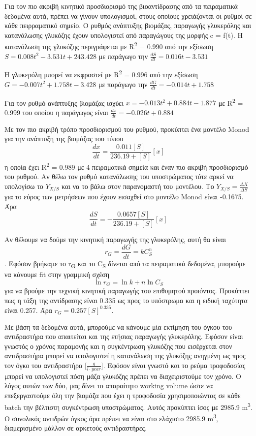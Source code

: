 \documentclass[11pt]{article}
\begin{document}
Για τον πιο ακριβή κινητικό προσδιορισμό της βιοαντίδρασης από τα πειραματικά δεδομένα αυτά, πρέπει να γίνουν υπολογισμοί, στους οποίους χρειάζονται οι ρυθμοί σε κάθε πειρραματικό σημείο. Ο ρυθμός ανάπτυξης βιομάζας, παραγωγής γλυκερόλης και κατανάλωσης γλυκόζης έχουν υπολογιστεί από παραγώγους της μορφής c = f(t). Η κατανάλωση της γλυκόζης περιγράφεται με R\textsuperscript{2} = 0.990 από την εξίσωση \(S = 0.008t^2 - 3.531t + 243.428\) με παράγωγο την \(\frac{dS}{dt} = 0.016t - 3.531\)

Η γλυκερόλη μπορεί να εκφραστεί με R\textsuperscript{2} = 0.996 από την εξίσωση \(G = -0.007t^2 + 1.758t - 3.428\) με παράγωγο την \(\frac{dG}{dt} = -0.014t + 1.758\)

Για τον ρυθμό ανάπτυξης βιομάζας ισχύει \(x = -0.013t^2 + 0.884t - 1.877\) με R\textsuperscript{2} = 0.999 του οποίου η παράγωγος είναι \(\frac{dx}{dt} = -0.026t+0.884\)

Με τον πιο ακριβή τρόπο προσδιορισμού του ρυθμού, προκύπτει ένα μοντέλο Monod για την ανάπτυξη της βιομάζας του τύπου \[ \frac{dx}{dt} = \frac{0.011[S]}{236.19+[S]}[x] \] η οποία έχει R\textsuperscript{2} = 0.989 με 4 πειραματικά σημεία και έναν πιο ακριβή προσδιορισμό του ρυθμού. Αν θέλω τον ρυθμό κατανάλωσης του υποστρώματος τότε αρκεί να υπολογίσω το \(Y_{X / S}\) και να το βάλω στον παρανομαστή του μοντέλου. Το \(Y_{X / S} = \frac{ΔX}{ΔS}\) για το εύρος των μετρήσεων που έχουν εισαχθεί στο μοντέλο Monod είναι -0.1675. Άρα \[ \frac{dS}{dt} = - \frac{0.0657[S]}{236.19 + [S]}[x] \] 

Αν θέλουμε να δούμε την κινητική παραγωγής της γλυκερόλης, αυτή θα είναι \[ r_G = \frac{dG}{dt} = k C_S^n \]. Εφόσον βρήκαμε το r\textsubscript{G} και το C\textsubscript{S} δίνεται από τα πειραματικά δεδομένα, μπορούμε να κάνουμε fit στην γραμμική σχέση \[ \ln r_G = \ln k + n \ln C_S\] για να βρούμε την τεχνική κινητική παραγωγής του επιθυμητού προιόντος. Προκύπτει πως η τάξη της αντίδρασης είναι 0.335 ως προς το υπόστρωμα και η ειδική ταχύτητα είναι 0.257. Άρα \(r_G = 0.257 [S]^{0.335}\).

Με βάση τα δεδομένα αυτά, μπορούμε να κάνουμε μία εκτίμηση του όγκου του αντιδραστήρα που απαιτείται και της ετήσιας παραγωγής γλυκερόλης. Εφόσον είναι γνωστός ο χρόνος παραμονής και η συγκέντρωση γλυκόζης που εισέρχεται στον αντιδραστήρα μπορεί να υπολογιστεί η κατανάλωση της γλυκόζης ανηγμένη ως προς τον όγκο του αντιδραστήρα [\(\frac{g}{l \cdot year}\)]. Εφόσον είναι γνωστό και το ρεύμα τροφοδοσίας μπορεί να υπολογιστεί πόση μάζα γλυκόζης πρέπει να διαχειριστούμε τον χρόνο. Ο λόγος αυτών των δύο, μας δίνει το απαραίτητο working volume ώστε να επεξεργαστούμε όλη την βιομάζα που έχει η τροφοδοσία χρησιμοποιώντας σε κάθε batch την βέλτιστη συγκέντρωση υποστρώματος. Αυτός προκύπτει ίσος με 2985.9 m\textsuperscript{3}. Ο συνολικός αντιδρών όγκος άρα πρέπει να είναι στο ελάχιστο 2985.9 m\textsuperscript{3}, διαμερισμένο μάλλον σε αρκετούς αντιδραστήρες.
\end{document}
